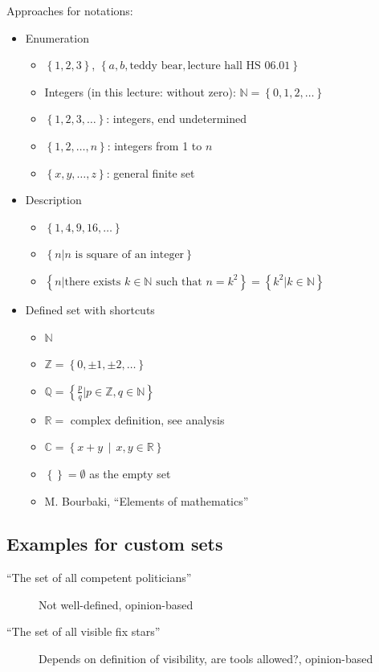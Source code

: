 \documentclass[a4paper,landscape,twocolumn]{article}
\newcommand\set[1]{\left\{#1\right\}}
\newcommand\setdef[2]{\left\{#1\,\middle|\,#2\right\}}
\begin{document}
Approaches for notations:
\begin{itemize}
  \item Enumeration
    \begin{itemize}
      \item $\set{1,2, 3}$, $\set{a, b, \text{teddy bear}, \text{lecture hall HS 06.01}}$
      \item Integers (in this lecture: without zero): $\mathbb{N} = \set{0, 1, 2, \ldots}$
      \item $\set{1, 2, 3, \ldots}$: integers, end undetermined
      \item $\set{1, 2, \ldots, n}$: integers from 1 to $n$
      \item $\set{x, y, \ldots, z}$: general finite set
    \end{itemize}
  \item Description
    \begin{itemize}
      \item $\set{1, 4, 9, 16, \ldots}$
      \item $\set{n | n \text{ is square of an integer}}$
      \item $\set{n | \text{there exists } k \in \mathbb{N} \text{ such that } n = k^2} = \set{k^2 | k \in \mathbb{N}}$
    \end{itemize}
  \item Defined set with shortcuts
    \begin{itemize}
      \item $\mathbb{N}$
      \item $\mathbb{Z} = \set{0, \pm 1, \pm 2, \ldots}$
      \item $\mathbb{Q} = \set{\frac{p}{q} | p \in \mathbb{Z}, q \in \mathbb{N}}$
      \item $\mathbb{R} = $ complex definition, see analysis
      \item $\mathbb{C} = \setdef{x + y}{x, y \in \mathbb{R}}$
      \item $\set{} = \emptyset$ as the empty set
      \item M. Bourbaki, \enquote{Elements of mathematics}
    \end{itemize}
\end{itemize}

\subsection{Examples for custom sets}

\begin{description}
  \item[\enquote{The set of all competent politicians}]
    Not well-defined, opinion-based
  \item[\enquote{The set of all visible fix stars}]
    Depends on definition of visibility, are tools allowed?, opinion-based
\end{description}
\end{document}
